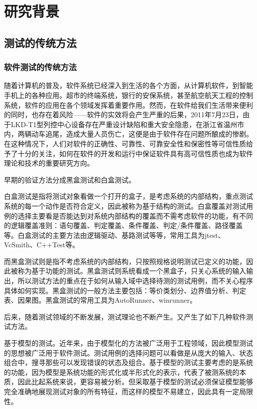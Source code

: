 ﻿\chapter{研究背景}
\section{测试的传统方法}
\subsection{软件测试的传统方法}
随着计算机的普及，软件系统已经深入到生活的各个方面，从计算机软件，到智能手机上的各种应用。超市的终端系统，银行的安保系统，甚至航空航天工程的控制系统，软件的应用在各个领域发挥着重要作用。然而，在软件给我们生活带来便利的同时，也存在着风险——软件的实效将会产生严重的后果，2011年7月23日，由于LKD-T1型列控中心设备存在严重设计缺陷和重大安全隐患，在浙江省温州市内，两辆动车追尾，造成大量人员伤亡，这便是由于软件存在问题所酿成的惨剧。在这种情况下，人们对软件的正确性、可靠性、可靠安全性和保密性等可信性质给予了十分的关注，如何在软件的开发和运行中保证软件具有高可信性质也成为软件理论和技术的重要研究方向。

早期的验证方法分成黑盒测试和白盒测试\cite{hetzel1991complete}。

白盒测试是指将测试对象看做一个打开的盒子，是考虑系统的内部结构，重点测试系统的每一个动作是否符合定义，因此被称为基于结构的测试。白盒覆盖对测试用例的选择主要看是否能达到对系统内部结构的覆盖而不需考虑软件的功能，有不同的逻辑覆盖准则：语句覆盖、判定覆盖、条件覆盖、判定/条件覆盖、路径覆盖等。白盒测试的主要方法由逻辑驱动、基路测试等等，常用工具为jtest、VcSmith、C++Test等。

而黑盒测试则是指不考虑系统的内部结构，只按照规格说明测试已定义的功能，因此被称为基于功能的测试。黑盒测试则系统看成一个黑盒子，只关心系统的输入输出，所以测试方法的重点在于如何从输入域中选择待测的测试用例，而不关心程序具体如何实现。黑盒测试的一般方法主要包括：等价类划分、边界值分析、判定表、因果图。黑盒测试的常用工具为AutoRunner、winrunner。


后来，随着测试领域的不断发展，测试理论也不断产生。又产生了如下几种软件测试方法。\cite{许静2003软件测试方法简述与展望}

基于模型的测试。近年来，由于模型化的方法被广泛用于工程领域，因此模型测试的思想被广泛用于软件测试。测试用例的选择问题可以看做是从庞大的输入、状态组合中，搜寻那些可以发现错误的状态及组合。基于模型的测试主要考虑的是系统的功能，因为模型是系统功能的形式化或半形式化的表示，代表了被测系统的本质，因此比起系统来说，更容易被分析。但采取基于模型的测试必须保证模型能够完全准确地展现测试对象的所有特征，而这样的模型不易建立，因此具有一定局限性。

